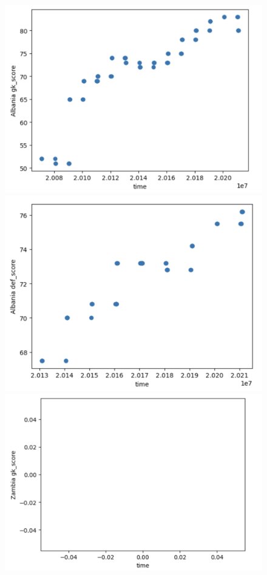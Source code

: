 \documentclass[8pt]{article}
\begin{document}
\begin{figure}[H]
    \centering
    \includegraphics[scale=.3]{alb_gk_values.png}
    \includegraphics[scale=.3]{alb_def_values.png}
    \includegraphics[scale=.3]{zam_gk_values.png}

\end{figure}
\end{document}
